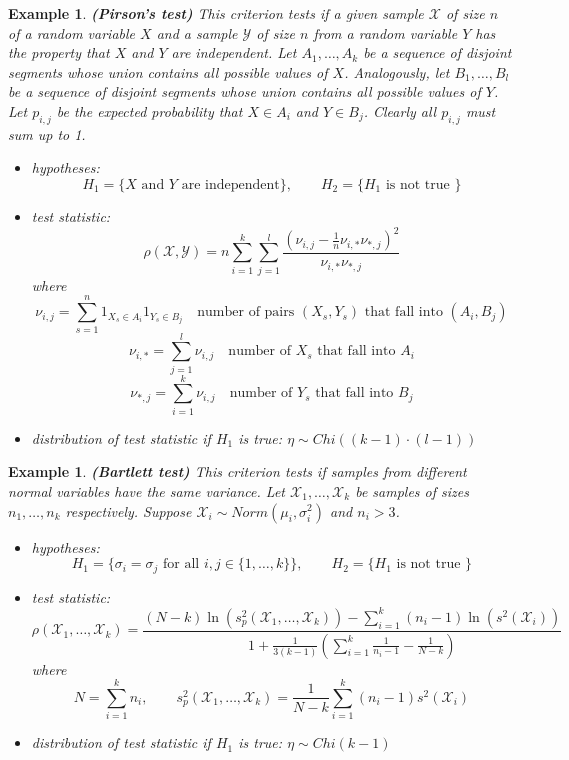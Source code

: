 \documentclass[12pt]{article}
\newtheorem{example}[theorem]{Example}
\begin{document}
\begin{example} \textbf{(Pirson's test)} This criterion tests if a given sample $\mathscr{X}$ of size $n$ of a random variable $X$ and a sample $\mathscr{Y}$ of size $n$ from a random variable $Y$ has the property that $X$ and $Y$ are independent. Let $A_1,\ldots,A_k$ be a sequence of disjoint segments whose union contains all possible values of $X$. Analogously, let $B_1,\ldots,B_l$ be a sequence of disjoint segments whose union contains all possible values of $Y$. Let $p_{i,j}$ be the expected probability that $X\in A_i$ and $Y\in B_j$. Clearly all $p_{i,j}$ must sum up to 1.
\begin{itemize}
    \item hypotheses: 
    $$H_1=\{X\mbox{ and }Y\mbox{ are independent}\},\quad\quad H_2=\{H_1\mbox{ is not true }\}$$
    \item test statistic: 
    $$\rho(\mathscr{X},\mathscr{Y})=n\sum_{i=1}^k\sum_{j=1}^l \frac{\left(\nu_{i,j}-\frac{1   }{n}\nu_{i,*}\nu_{*,j}\right)^2}{\nu_{i,*}\nu_{*,j}}$$
    where
    $$
    \nu_{i,j}=\sum_{s=1}^n 1_{X_s\in A_i}1_{Y_s\in B_j}\quad \mbox{number of pairs }(X_s,Y_s)\mbox{ that fall into }(A_i,B_j)
    $$
    $$
    \nu_{i,*}=\sum_{j=1}^{l}\nu_{i,j}\quad \mbox{number of }X_s\mbox{ that fall into }A_i
    $$
    $$
    \nu_{*,j}=\sum_{i=1}^{k}\nu_{i,j}\quad \mbox{number of }Y_s\mbox{ that fall into }B_j
    $$

    \item distribution of test statistic if $H_1$ is true: $\eta\sim Chi((k-1)\cdot(l-1))$
\end{itemize}
\end{example}

\begin{example} \textbf{(Bartlett test)} This criterion tests if samples from different normal variables have the same variance. Let $\mathscr{X}_1,\ldots,\mathscr{X}_k$ be samples of sizes $n_1,\ldots,n_k$ respectively. Suppose $\mathscr{X}_i\sim Norm(\mu_i,\sigma_i^2)$ and $n_i>3$. 
\begin{itemize}
    \item hypotheses: 
    $$H_1=\{\sigma_i=\sigma_j\mbox{ for all }i,j\in\{1,\ldots,k\}\},\quad\quad H_2=\{H_1\mbox{ is not true }\}$$
    \item test statistic: 
    $$
    \rho(\mathscr{X}_1,\ldots,\mathscr{X}_k)=\frac{(N-k)\ln(s_p^2(\mathscr{X}_1,\ldots,\mathscr{X}_k))-\sum_{i=1}^k (n_i-1)\ln(s^2(\mathscr{X}_i))}{1+\frac{1}{3(k-1)}\left(\sum_{i=1}^k \frac{1}{n_i-1}-\frac{1}{N-k}\right)}
    $$
    where
    $$
    N=\sum_{i=1}^k n_i,
    \quad\quad
    s_p^2(\mathscr{X}_1,\ldots,\mathscr{X}_k)=\frac{1}{N-k}\sum_{i=1}^k (n_i-1) s^2(\mathscr{X}_i)
    $$
    \item distribution of test statistic if $H_1$ is true: $\eta\sim Chi(k-1)$
\end{itemize}
\end{example}
\end{document}
